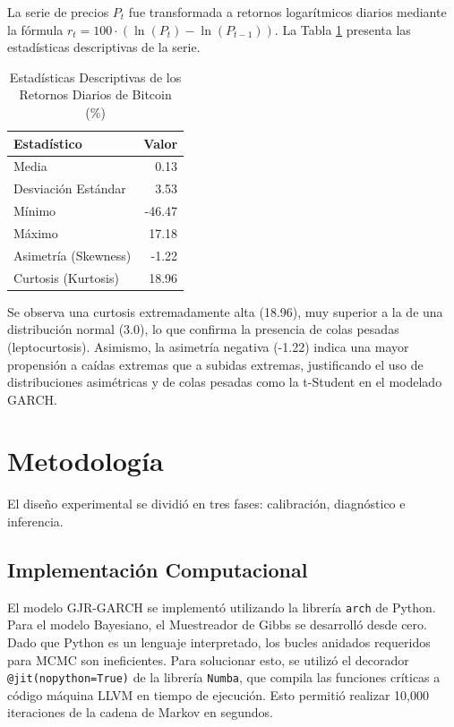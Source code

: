 \documentclass[
]{ceurart}
\begin{document}
La serie de precios $P_t$ fue transformada a retornos logarítmicos diarios mediante la fórmula $r_{t}=100 \cdot (\ln(P_{t})-\ln(P_{t-1}))$. La Tabla \ref{tab:stats} presenta las estadísticas descriptivas de la serie.

\begin{table}[h]
\centering
\caption{Estadísticas Descriptivas de los Retornos Diarios de Bitcoin (\%)}
\label{tab:stats}
\begin{tabular}{lr}
\toprule
Estadístico & Valor \\
\midrule
Media & 0.13 \\
Desviación Estándar & 3.53 \\
Mínimo & -46.47 \\
Máximo & 17.18 \\
Asimetría (Skewness) & -1.22 \\
Curtosis (Kurtosis) & 18.96 \\
\bottomrule
\end{tabular}
\end{table}

Se observa una curtosis extremadamente alta (18.96), muy superior a la de una distribución normal (3.0), lo que confirma la presencia de colas pesadas (leptocurtosis). Asimismo, la asimetría negativa (-1.22) indica una mayor propensión a caídas extremas que a subidas extremas, justificando el uso de distribuciones asimétricas y de colas pesadas como la t-Student en el modelado GARCH.

\section{Metodología}

El diseño experimental se dividió en tres fases: calibración, diagnóstico e inferencia.

\subsection{Implementación Computacional}
El modelo GJR-GARCH se implementó utilizando la librería \texttt{arch} de Python. Para el modelo Bayesiano, el Muestreador de Gibbs se desarrolló desde cero. Dado que Python es un lenguaje interpretado, los bucles anidados requeridos para MCMC son ineficientes. Para solucionar esto, se utilizó el decorador \texttt{@jit(nopython=True)} de la librería \texttt{Numba}, que compila las funciones críticas a código máquina LLVM en tiempo de ejecución. Esto permitió realizar 10,000 iteraciones de la cadena de Markov en segundos.
\end{document}
